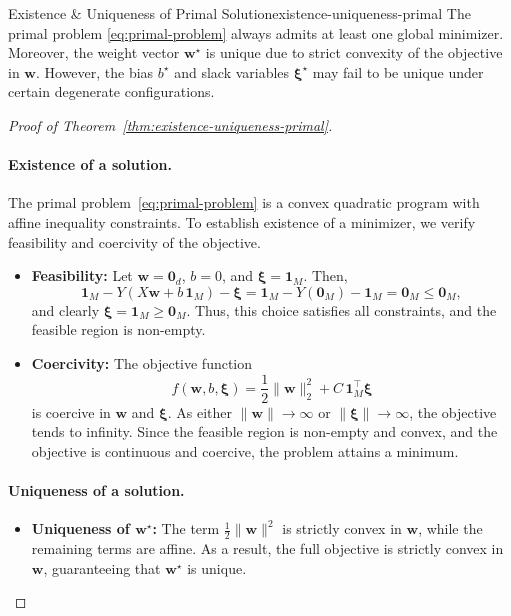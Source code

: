 \begin{theorem}{Existence \& Uniqueness of Primal Solution}{existence-uniqueness-primal}
	The primal problem \eqref{eq:primal-problem} always admits at least one global minimizer. Moreover, the weight vector $\symbf{w}^\star$ is unique due to strict convexity of the objective in $\symbf{w}$. However, the bias $b^\star$ and slack variables $\symbf{\xi}^\star$ may fail to be unique under certain degenerate configurations.
\end{theorem}

\begin{proof}[Proof of Theorem~\ref{thm:existence-uniqueness-primal}]
	\paragraph{Existence of a solution.}
	The primal problem~\eqref{eq:primal-problem} is a convex quadratic program with affine inequality constraints. To establish existence of a minimizer, we verify feasibility and coercivity of the objective.

	\begin{itemize}
		\item \textbf{Feasibility:} Let $\symbf{w} = \symbf{0}_d$, $b = 0$, and $\symbf{\xi} = \symbf{1}_M$. Then,
		      \[
			      \symbf{1}_M - Y\left(X\symbf{w} + b\,\symbf{1}_M\right) - \symbf{\xi}
			      = \symbf{1}_M - Y(\symbf{0}_M) - \symbf{1}_M = \symbf{0}_M \le \symbf{0}_M,
		      \]
		      and clearly $\symbf{\xi} = \symbf{1}_M \ge \symbf{0}_M$. Thus, this choice satisfies all constraints, and the feasible region is non-empty.

		\item \textbf{Coercivity:} The objective function
		      \[
			      f(\symbf{w}, b, \symbf{\xi}) = \frac{1}{2} \|\symbf{w}\|_2^2 + C\, \symbf{1}_M^\top \symbf{\xi}
		      \]
		      is coercive in $\symbf{w}$ and $\symbf{\xi}$. As either $\|\symbf{w}\| \to \infty$ or $\|\symbf{\xi}\| \to \infty$, the objective tends to infinity. Since the feasible region is non-empty and convex, and the objective is continuous and coercive, the problem attains a minimum.
	\end{itemize}

	\paragraph{Uniqueness of a solution.}
	\begin{itemize}
		\item \textbf{Uniqueness of $\symbf{w}^\star$:}
		      The term $\tfrac{1}{2}\|\symbf{w}\|^2$ is strictly convex in $\symbf{w}$, while the remaining terms are affine. As a result, the full objective is strictly convex in $\symbf{w}$, guaranteeing that $\symbf{w}^\star$ is unique.


\end{itemize}
\end{proof}
